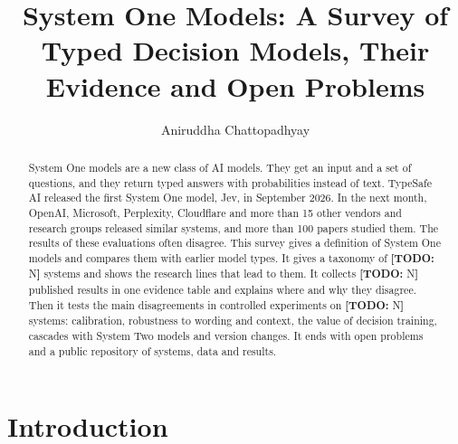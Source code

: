 \documentclass[acmsmall,nonacm,screen]{acmart}
\newcommand{\todo}[1]{{\color{red}\textbf{[TODO: }#1\textbf{]}}}
\newcommand{\sone}{System One model\xspace}
\newcommand{\sones}{System One models\xspace}
\newcommand{\stwos}{System Two models\xspace}
\begin{document}
\title{System One Models: A Survey of Typed Decision Models, Their Evidence and Open Problems}

\author{Aniruddha Chattopadhyay}

\begin{abstract}
\sones are a new class of AI models. They get an input and a set of questions, and they return typed answers with probabilities instead of text. TypeSafe AI released the first \sone, Jev, in September 2026. In the next month, OpenAI, Microsoft, Perplexity, Cloudflare and more than 15 other vendors and research groups released similar systems, and more than 100 papers studied them. The results of these evaluations often disagree. This survey gives a definition of \sones and compares them with earlier model types. It gives a taxonomy of \todo{N} systems and shows the research lines that lead to them. It collects \todo{N} published results in one evidence table and explains where and why they disagree. Then it tests the main disagreements in controlled experiments on \todo{N} systems: calibration, robustness to wording and context, the value of decision training, cascades with \stwos and version changes. It ends with open problems and a public repository of systems, data and results.
\end{abstract}


\maketitle

\section{Introduction}
\label{sec:intro}
\end{document}
